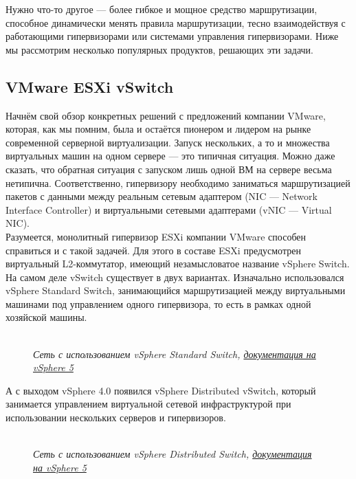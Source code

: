 \documentclass[14pt, a4paper]{article}
\begin{document}
Нужно что-то другое — более гибкое и мощное средство маршрутизации, способное динамически
менять правила маршрутизации, тесно взаимодействуя с работающими гипервизорами или
системами управления гипервизорами. Ниже мы рассмотрим несколько популярных продуктов,
решающих эти задачи.

\subsection*{VMware ESXi vSwitch} 

Начнём свой обзор конкретных решений с предложений компании VMware, которая, как мы помним,
была и остаётся пионером и лидером на рынке современной серверной виртуализации. Запуск
нескольких, а то и множества виртуальных машин на одном сервере — это типичная ситуация. Можно
даже сказать, что обратная ситуация с запуском лишь одной ВМ на сервере весьма нетипична.
Соответственно, гипервизору необходимо заниматься маршрутизацией пакетов с данными между
реальным сетевым адаптером (NIC — Network Interface Controller) и виртуальными сетевыми
адаптерами (vNIC — Virtual NIC).\\

Разумеется, монолитный гипервизор ESXi компании VMware способен справиться и с такой задачей.
Для этого в составе ESXi предусмотрен виртуальный L2-коммутатор, имеющий незамысловатое
название vSphere Switch. На самом деле vSwitch существует в двух вариантах. Изначально
использовался vSphere Standard Switch, занимающийся маршрутизацией между виртуальными
машинами под управлением одного гипервизора, то есть в рамках одной хозяйской машины.

\begin{figure}[h]
    \centering
    \\ 
    \small\textit{Сеть с использованием vSphere Standard Switch, \href{https://docs.vmware.com/en/VMware-vSphere/index.html}{документация на vSphere 5}}  
    \label{framework} 
\end{figure}

А с выходом vSphere 4.0 появился vSphere Distributed vSwitch, который занимается управлением
виртуальной сетевой инфраструктурой при использовании нескольких серверов и гипервизоров.

\newpage

\begin{figure}[h]
    \centering
     \\
    \small\textit{Сеть с использованием vSphere Distributed Switch, \href{https://docs.vmware.com/en/VMware-vSphere/index.html}{документация на vSphere 5}} 
    \label{framework} 
\end{figure}
\end{document}
